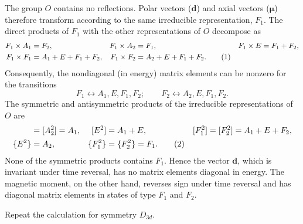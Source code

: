 \SolutionHeading The group $O$ contains no reflections. Polar vectors
($\mathbf d$) and axial vectors ($\boldsymbol\mu$) therefore transform
according to the same irreducible representation, $F_1$. The direct products
of $F_1$ with the other representations of $O$ decompose as
\begin{align}
 F_1\times A_1&=F_2,&F_1\times A_2&=F_1,&F_1\times E&=F_1+F_2,\notag\\
 F_1\times F_1&=A_1+E+F_1+F_2,&F_1\times F_2&=A_2+E+F_1+F_2.\tag{1}
\end{align}
Consequently, the nondiagonal (in energy) matrix elements can be nonzero for
the transitions
\[
 F_1\leftrightarrow A_1,E,F_1,F_2;\qquad F_2\leftrightarrow A_2,E,F_1,F_2.
\]
The symmetric and antisymmetric products of the irreducible representations
of $O$ are
\begin{align}
 [A_1^2]&=[A_2^2]=A_1,&[E^2]&=A_1+E,&[F_1^2]&=[F_2^2]=A_1+E+F_2,\notag\\
 \{E^2\}&=A_2,&\{F_1^2\}&=\{F_2^2\}=F_1.\tag{2}
\end{align}
None of the symmetric products contains $F_1$. Hence the vector $\mathbf d$,
which is invariant under time reversal, has no matrix elements diagonal in
energy. The magnetic moment, on the other hand, reverses sign under time
reversal and has diagonal matrix elements in states of type $F_1$ and $F_2$.

 Repeat the calculation for symmetry $D_{3d}$.

